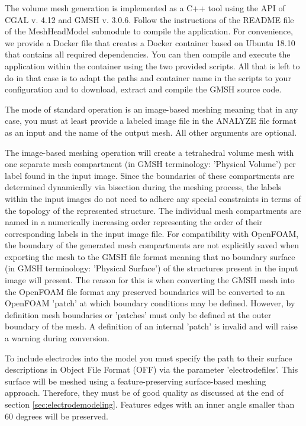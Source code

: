 The volume mesh generation is implemented as a C++ tool using the API of CGAL v. 4.12 and GMSH v. 3.0.6.
Follow the instructions of the README file of the MeshHeadModel submodule to compile the application.
For convenience, we provide a Docker file that creates a Docker container based on Ubuntu 18.10
that contains all required dependencies. You can then compile and execute the application within the container
using the two provided scripts. All that is left to do in that case is to adapt the paths and container name
in the scripts to your configuration and to download, extract and compile the GMSH source code.\par
The mode of standard operation is an image-based meshing meaning that in any case, you must at least provide a
labeled image file in the ANALYZE file format as an input and the name of the output mesh. All other arguments
are optional.\par
The image-based meshing operation will create a tetrahedral volume mesh with one separate mesh compartment
(in GMSH terminology: 'Physical Volume') per label found in the input image. Since the boundaries of these
compartments are determined dynamically via bisection during the meshing process, the labels within the 
input images do not need to adhere any special constraints in terms of the topology of the represented 
structure. The individual mesh compartments are named in a numerically increasing order representing the
order of their corresponding labels in the input image file. For compatibility with OpenFOAM, the boundary
of the generated mesh compartments are not explicitly saved when exporting the mesh to the GMSH file
format meaning that no boundary surface (in GMSH terminology: 'Physical Surface') of the structures present
in the input image will present. The reason for this is when converting the GMSH mesh into the OpenFOAM file
format any preserved boundaries will be converted to an OpenFOAM 'patch' at which boundary conditions may be
defined. However, by definition mesh boundaries or 'patches' must only be defined at the outer boundary of
the mesh. A definition of an internal 'patch' is invalid and will raise a warning during conversion.\par
To include electrodes into the model you must specify the path to their surface descriptions in Object File 
Format (OFF) via the parameter 'electrodefiles'. This surface will be meshed using a feature-preserving 
surface-based meshing approach. Therefore, they must be of good quality as discussed at the end of section
\ref{sec:electrodemodeling}. Features edges with an inner angle smaller than 60 degrees will be preserved.
